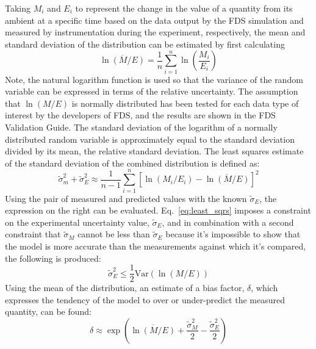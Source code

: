 Taking $M_i$ and $E_i$ to represent the change in the value of a quantity from its ambient at a specific time based on the data output by the FDS simulation and measured by instrumentation during the experiment, respectively, the mean and standard deviation of the distribution can be estimated by first calculating
\begin{equation} 
	\overline{\ln(M/E)}=\frac{1}{n} \sum_{i=1}^n \ln\left( \frac{M_i}{E_i} \right)
\end{equation}
Note, the natural logarithm function is used so that the variance of the random variable can be expressed in terms of the relative uncertainty. The assumption that $\ln(M/E)$ is normally distributed has been tested for each data type of interest by the developers of FDS, and the results are shown in the FDS Validation Guide. The standard deviation of the logarithm of a normally distributed random variable is approximately equal to the standard deviation divided by its mean, the relative standard deviation. The least squares estimate of the standard deviation of the combined distribution is defined as:
\begin{equation}
\label{eq:least_sqrs}
	\widetilde{\sigma}_m^2 + \widetilde{\sigma}_E^2 \approx \frac{1}{n-1}\sum_{i=1}^n \left[ \ln(M_i/E_i) - \overline{\ln(M/E)} \right]^2
\end{equation}
Using the pair of measured and predicted values with the known $\widetilde{\sigma}_E$, the expression on the right can be evaluated. Eq.~\ref{eq:least_sqrs} imposes a constraint on the experimental uncertainty value, $\widetilde{\sigma}_E$, and in combination with a second constraint that $\widetilde{\sigma}_M$ cannot be less than $\widetilde{\sigma}_E$ because it's impossible to show that the model is more accurate than the measurements against which it's compared, the following is produced:
\begin{equation}
	\widetilde{\sigma}_E^2 \leq \frac{1}{2}\textrm{Var}(\ln(M/E))
\end{equation}
Using the mean of the distribution, an estimate of a bias factor, $\delta$, which expresses the tendency of the model to over or under-predict the measured quantity, can be found:
\begin{equation}
	\delta \approx \exp\left( \overline{\ln(M/E)}+\frac{\widetilde{\sigma}_M^2}{2}-\frac{\widetilde{\sigma}_E^2}{2} \right)
\end{equation}


